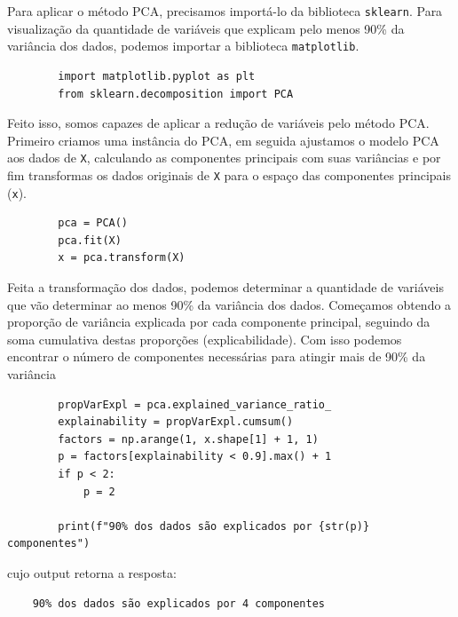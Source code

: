 Para aplicar o método PCA, precisamos importá-lo da biblioteca \verb|sklearn|. Para visualização da quantidade de variáveis que explicam pelo menos 90\% da variância dos dados, podemos importar a biblioteca \verb|matplotlib|.
\begin{longlisting}
    \begin{verbatim}
        import matplotlib.pyplot as plt
        from sklearn.decomposition import PCA
    \end{verbatim}
\end{longlisting}

Feito isso, somos capazes de aplicar a redução de variáveis pelo método PCA. Primeiro criamos uma instância do PCA, em seguida ajustamos o modelo PCA aos dados de \verb|X|, calculando as componentes principais com suas variâncias e por fim transformas os dados originais de \verb|X| para o espaço das componentes principais (\verb|x|).
\begin{longlisting}
    \begin{verbatim}
        pca = PCA()
        pca.fit(X)
        x = pca.transform(X)
    \end{verbatim}
\end{longlisting}

Feita a transformação dos dados, podemos determinar a quantidade de variáveis que vão determinar ao menos 90\% da variância dos dados. Começamos obtendo a proporção de variância explicada por cada componente principal, seguindo da soma cumulativa destas proporções (explicabilidade). Com isso podemos encontrar o número de componentes necessárias para atingir mais de 90\% da variância
\begin{longlisting}
    \begin{verbatim}
        propVarExpl = pca.explained_variance_ratio_
        explainability = propVarExpl.cumsum()
        factors = np.arange(1, x.shape[1] + 1, 1)
        p = factors[explainability < 0.9].max() + 1
        if p < 2:
            p = 2
        
        print(f"90% dos dados são explicados por {str(p)} componentes")
    \end{verbatim}
\end{longlisting}
cujo output retorna a resposta: 
\begin{verbatim}
    90% dos dados são explicados por 4 componentes
\end{verbatim}

